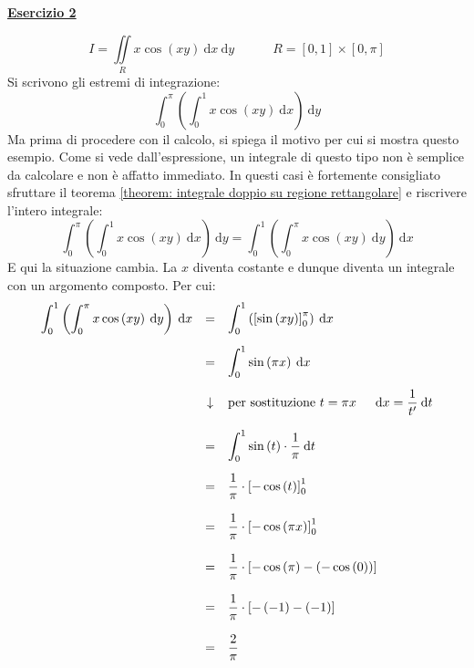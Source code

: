 \documentclass[a4paper]{article}
\newcommand{\example}[1]{\textcolor{Green4}{\textbf{#1}}}
\begin{document}
	\begin{flushleft}
		\example{\underline{Esercizio 2}}
	\end{flushleft}
	\begin{equation*}
		I = \displaystyle\iint \limits_{R} x \cos\left(xy\right) \:\mathrm{d}x \:\mathrm{d}y \hspace{3em} R = \left[0,1\right] \times \left[0,\pi\right]
	\end{equation*}
	Si scrivono gli estremi di integrazione:
	\begin{equation*}
		\displaystyle\int_{0}^{\pi} \left(\int_{0}^{1} x \cos\left(xy\right) \: \mathrm{d}x\right) \:\mathrm{d}y
	\end{equation*}
	Ma prima di procedere con il calcolo, si spiega il motivo per cui si mostra questo esempio. Come si vede dall'espressione, un integrale di questo tipo non è semplice da calcolare e non è affatto immediato. In questi casi è fortemente consigliato sfruttare il teorema \ref{theorem: integrale doppio su regione rettangolare} e riscrivere l'intero integrale:
	\begin{equation*}
		\displaystyle\int_{0}^{\pi} \left(\int_{0}^{1} x \cos\left(xy\right) \: \mathrm{d}x\right) \:\mathrm{d}y
		=
		\displaystyle\int_{0}^{1} \left(\int_{0}^{\pi} x \cos\left(xy\right) \: \mathrm{d}y\right) \:\mathrm{d}x
	\end{equation*}
	E qui la situazione cambia. La $x$ diventa costante e dunque diventa un integrale con un argomento composto. Per cui:
	\begin{equation*}
		\begin{array}{rcl}
			\displaystyle\int_{0}^{1} \left(\int_{0}^{\pi} x \cos\left(xy\right) \: \mathrm{d}y\right) \:\mathrm{d}x
			&=&
			\displaystyle\int_{0}^{1} \left(\left[\sin\left(xy\right)\right]_{0}^{\pi}\right) \:\mathrm{d}x \\ [1.5em]
			&=&
			\displaystyle\int_{0}^{1} \sin\left(\pi x\right) \:\mathrm{d}x \\ [1.5em]
			&\downarrow&
			\text{per sostituzione } t = \pi x \hspace{1.5em} \mathrm{d}x = \dfrac{1}{t'} \:\mathrm{d}t \\ [1.5em]
			&=& \displaystyle\int_{0}^{1} \sin\left(t\right) \cdot \dfrac{1}{\pi} \: \mathrm{d}t \\ [1.5em]
			&=& \dfrac{1}{\pi} \cdot \left[- \cos\left(t\right)\right]_{0}^{1} \\ [1.5em]
			&=& \dfrac{1}{\pi} \cdot \left[- \cos\left(\pi x\right)\right]_{0}^{1} \\ [1.5em]
			&=& \dfrac{1}{\pi} \cdot \left[- \cos\left(\pi\right) - \left(- \cos\left(0\right)\right)\right] \\ [1.5em]
			&=& \dfrac{1}{\pi} \cdot \left[- \left(-1\right) - \left(- 1\right)\right] \\ [1.5em]
			&=& \dfrac{2}{\pi}
		\end{array}
	\end{equation*}\newpage
\end{document}
